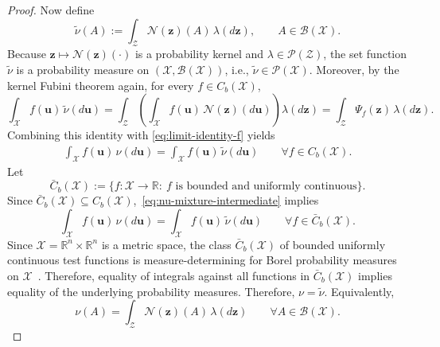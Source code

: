 \documentclass[opre,sglanonrev]{informs4}
\newcommand{\mZ}{\mathcal{Z}}
\newcommand{\mN}{\mathcal{N}}
\newcommand{\mX}{\mathcal{X}}
\newcommand{\mB}{\mathcal{B}}
\newcommand{\bu}{\bm{u}}
\newcommand{\bz}{\bm{z}}
\newcommand{\srevision}[1]{{\color{black}{#1}}}
\begin{document}
{\begin{APPENDICES}
\begin{proof}
Now define
\[
\tilde\nu(A)
:=
\int_{\mZ}\mN(\bz)(A)\,\lambda(d\bz),
\qquad A\in\mB(\mX).
\]
Because \(\bz\mapsto\mN(\bz)(\cdot)\) is a probability kernel and
\(\lambda\in\mathcal P(\mZ)\), the set function \(\tilde\nu\) is a probability
measure on \((\mX,\mB(\mX))\), i.e., \(\tilde\nu\in\mathcal P(\mX)\).
Moreover, by the kernel Fubini theorem again, for every \(f\in C_b(\mX)\),
\[
\int_{\mX} f(\bu)\,\tilde\nu(d\bu)
=
\int_{\mZ}
\left(\int_{\mX} f(\bu)\,\mN(\bz)(d\bu)\right)\lambda(d\bz)
=
\int_{\mZ}\Psi_f(\bz)\,\lambda(d\bz).
\]
Combining this identity with \eqref{eq:limit-identity-f} yields
\begin{align}\label{eq:nu-mixture-intermediate}
    \int_{\mX}f(\bu)\,\nu(d\bu)
=
\int_{\mX}f(\bu)\,\tilde\nu(d\bu)
\qquad \forall f\in C_b(\mX).
\end{align}
Let
\[
\bar{C}_b(\mX)
:=
\{f:\mX\to\mathbb R:\ f \text{ is bounded and uniformly continuous}\}.
\]
Since $\bar{C}_b(\mX)\subseteq C_b(\mX)$,~\eqref{eq:nu-mixture-intermediate} implies
\[
\int_{\mX}f(\bu)\,\nu(d\bu)
=
\int_{\mX}f(\bu)\,\tilde\nu(d\bu)
\qquad \forall f\in \bar{C}_b(\mX).
\]
Since \(\mX=\mathbb R^n\times\mathbb R^n\) is a metric space, the class
\(\bar{C}_b(\mX)\) of bounded uniformly continuous test functions is
measure-determining for Borel probability measures on \(\mX\)~\cite[Vol.~II, Remark~8.3.1; see also Theorem~8.2.3 and Corollary~8.2.4]{bogachev_measure_2007}. Therefore, equality of integrals against all functions in
\(\bar{C}_b(\mX)\) implies equality of the underlying probability measures.
Therefore, \(\nu=\tilde\nu\). Equivalently,
\begin{equation}\label{eq:nu-mixture}
\nu(A)
=
\int_{\mZ}\mN(\bz)(A)\,\lambda(d\bz)
\qquad \forall A\in\mB(\mX).
\end{equation}


\end{proof}
\end{APPENDICES}}
\end{document}
